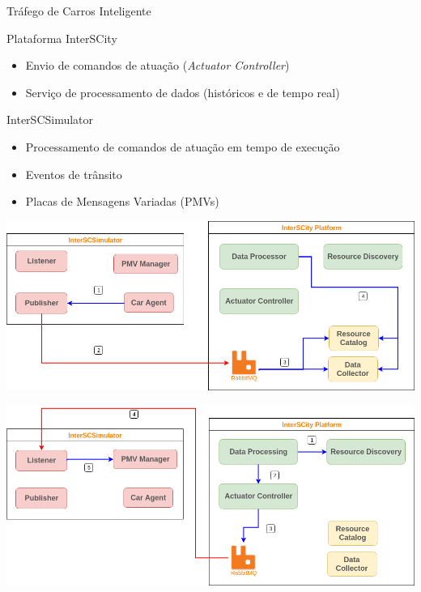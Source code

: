 \documentclass[xcolor={usenames,svgnames,dvipsnames},brazil,english,12pt,aspectratio=149]{beamer}
\begin{document}
\begin{frame}{Tráfego de Carros Inteligente}
    \begin{block}{Plataforma InterSCity}
        \begin{itemize}
            \item Envio de comandos de atuação (\textit{Actuator Controller})
            \item Serviço de processamento de dados (históricos e de tempo real)
        \end{itemize}
    \end{block}

    \begin{block}{InterSCSimulator}
        \begin{itemize}
            \item Processamento de comandos de atuação em tempo de execução
            \item Eventos de trânsito
            \item Placas de Mensagens Variadas (PMVs)
        \end{itemize}
    \end{block}
\end{frame}

\begin{frame}[plain]
    \begin{center}
        \includegraphics[width=\textwidth]{integration-publish-car-position.png}
    \end{center}
\end{frame}

\begin{frame}[plain]
    \begin{center}
        \includegraphics[width=\textwidth]{integration-actuate-pmv.png}
    \end{center}
\end{frame}
\end{document}
